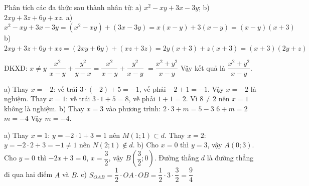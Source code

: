 \begin{problem}
Phân tích các đa thức sau thành nhân tử: a) $x^2 - xy + 3x - 3y$; b) $2xy + 3z + 6y + xz$.
a) $x^2 - xy + 3x - 3y = (x^2 - xy) + (3x - 3y) = x(x - y) + 3(x - y) = (x - y)(x + 3)$
b) $2xy + 3z + 6y + xz = (2xy + 6y) + (xz + 3z) = 2y(x + 3) + z(x + 3) = (x + 3)(2y + z)$
\end{problem}

\begin{problem}[8DS-PS-003]
ĐKXĐ: $x \neq y$
$\dfrac{x^2}{x - y} + \dfrac{y^2}{y - x} = \dfrac{x^2}{x - y} + \dfrac{y^2}{x - y}$
$= \dfrac{x^2 + y^2}{x - y}$
Vậy kết quả là $\dfrac{x^2 + y^2}{x - y}$.
\end{problem}

\begin{problem}[8DS-PT1-002]
a) Thay $x = -2$: vế trái $3 \cdot (-2) + 5 = -1$, vế phải $-2 + 1 = -1$. Vậy $x = -2$ là nghiệm.
Thay $x = 1$: vế trái $3 \cdot 1 + 5 = 8$, vế phải $1 + 1 = 2$. Vì $8 \neq 2$ nên $x = 1$ không là nghiệm.
b) Thay $x = 3$ vào phương trình: $2 \cdot 3 + m = 5 - 3$
$6 + m = 2$
$m = -4$
Vậy $m = -4$.
\end{problem}

\begin{problem}[8DS-HSBN-003]
a) Thay $x = 1$: $y = -2 \cdot 1 + 3 = 1$ nên $M(1; 1) \subset d$.
Thay $x = 2$: $y = -2 \cdot 2 + 3 = -1 \neq 1$ nên $N(2; 1) \notin d$.
b) Cho $x = 0$ thì $y = 3$, vậy $A(0; 3)$.
Cho $y = 0$ thì $-2x + 3 = 0$, $x = \dfrac{3}{2}$, vậy $B\left(\dfrac{3}{2}; 0\right)$.
Đường thẳng $d$ là đường thẳng đi qua hai điểm $A$ và $B$.
c) $S_{OAB} = \dfrac{1}{2} \cdot OA \cdot OB = \dfrac{1}{2} \cdot 3 \cdot \dfrac{3}{2} = \dfrac{9}{4}$
\end{problem}
